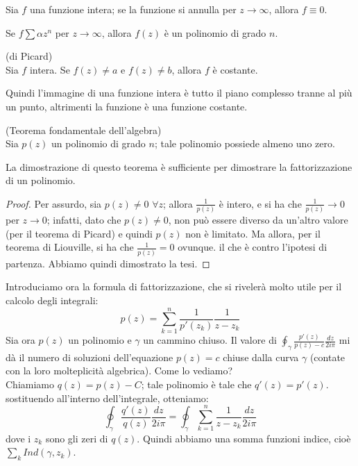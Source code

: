 \begin{corollario}
Sia $f$ una funzione intera; se la funzione si annulla per $z \to \infty$, allora $f \equiv 0$.
\end{corollario}
\begin{corollario}
Se $f \sum \alpha z^n$ per $z \to \infty$, allora $f(z)$ è un polinomio di grado $n$.
\end{corollario}
\begin{teorema} (di Picard)\\
Sia $f$ intera. Se $f(z) \neq a$ e $f(z) \neq b$, allora $f$ è costante.
\end{teorema}
Quindi l'immagine di una funzione intera è tutto il piano complesso tranne al più un punto, altrimenti la funzione è una funzione costante.
\begin{teorema} (Teorema fondamentale dell'algebra)\\
Sia $p(z)$ un polinomio di grado $n$; tale polinomio possiede almeno uno zero.
\end{teorema}
La dimostrazione di questo teorema è sufficiente per dimostrare la fattorizzazione di un polinomio.
\begin{proof}
Per assurdo, sia $p(z) \neq 0$ $\forall z$; allora $\frac{1}{p(z)}$ è intero, e si ha che $\frac{1}{p(z)} \to 0$ per $z \to 0$; infatti, dato che $p(z) \neq 0$, non può essere diverso da un'altro valore (per il teorema di Picard) e quindi $p(z)$ non è limitato. Ma allora, per il teorema di Liouville, si ha che $\frac{1}{p(z)}=0$ ovunque. il che è contro l'ipotesi di partenza. Abbiamo quindi dimostrato la tesi.
\end{proof}

Introduciamo ora la formula di fattorizzazione, che si rivelerà molto utile per il calcolo degli integrali:
\begin{equation}
p(z)=\sum_{k=1} ^n \frac{1}{p'(z_k)} \frac{1}{z-z_k}
\end{equation}
Sia ora $p(z)$ un polinomio e $\gamma$ un cammino chiuso. Il valore di $\oint_{\gamma} \frac{p'(z)}{p(z)-c} \frac{dz}{2 i \pi} $ mi dà il numero di soluzioni dell'equazione $p(z)=c$ chiuse dalla curva $\gamma$ (contate con la loro molteplicità algebrica). Come lo vediamo? \\ Chiamiamo $q(z)=p(z)-C$; tale polinomio è tale che $q'(z)=p'(z)$. sostituendo all'interno dell'integrale, otteniamo:
$$\oint_{\gamma} \frac{q'(z)}{q(z)} \frac{dz}{2 i \pi}=\oint_{\gamma} \sum_{k=1} ^n \frac{1}{z-z_k} \frac{dz}{2 i \pi}$$
dove i $z_k$ sono gli zeri di $q(z)$.
Quindi abbiamo una somma funzioni indice, cioè $\sum_k Ind(\gamma,z_k)$.

